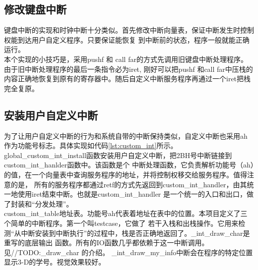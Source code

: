 \documentclass[a4paper]{article}
\begin{document}
    \subsection{修改键盘中断}
    键盘中断的实现和时钟中断十分类似。首先修改中断向量表，保证中断发生时控制权能到达用户自定义程序。只要保证能恢复
    到中断前的状态，程序一般就能正确运行。\\
    
    本个实现的小技巧是，采用pushf 和 call far的方式先调用旧键盘中断处理程序。由于旧中断处理程序的最后一条指令必为iret,
    刚好可以把pushf 和call far中压栈的内容正确地恢复到原有的寄存器中。随后自定义中断服务程序再通过一个iret把栈完全复原。
    \subsection{安装用户自定义中断}
    为了让用户自定义中断的行为和系统自带的中断保持类似，自定义中断也采用ah作为功能号标志。具体实现如代码\ref{lst:custom_int}所示。\\

    global\_custom\_int\_install函数安装用户自定义中断，把2BH号中断链接到custom\_int\_hanlder函数中。该函数是个
    中断处理函数，它负责解析功能号（ah）的值，在一个向量表中查询服务程序的地址，并将控制权移交给服务程序。值得注意的是，
    所有的服务程序都通过retf的方式先返回到custom\_int\_handler，由其统一地使用iret结束中断。也就是custom\_int\_handler
    是一个统一的入口和出口，做了封装和``分发处理''。\\
    
    custom\_int\_table地址表。功能号ah代表着地址在表中的位置。本项目定义了三个简单的中断程序。第一个叫testcase，它做了
    若干入栈和出栈操作。它用来检测``从中断安装到中断执行''的过程中，栈是否正确地返回了。\_int\_draw\_char是重写的底层输出
    函数。所有的IO函数几乎都依赖于这一中断调用。见//TODO:\_draw\_char
    的介绍。
    \_int\_draw\_my\_info中断会在程序的特定位置显示3-D的学号。视觉效果较好。
    
\end{document}
